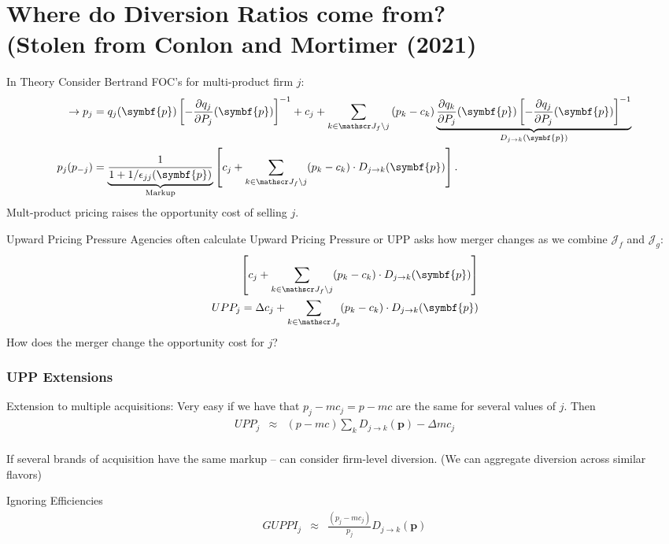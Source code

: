 \documentclass[aspectratio=169,10pt]{beamer}
\begin{document}
\section{Where do Diversion Ratios come from?\\ (Stolen from Conlon and Mortimer (2021)}
\begin{frame}{In Theory}
\footnotesize
Consider Bertrand FOC's for multi-product firm $j$:
\begin{align*}
\label{eq:best_response}
\rightarrow \nonumber p_j &=q_{j}(\symbf{p}) \left[-\frac{\partial q_{j}}{\partial P_{j}}(\symbf{p})\right]^{-1} + c_{j} + \sum_{k \in \calJ_{f} \setminus j} \left(p_{k}-c_{k}\right) \underbrace{\frac{\partial q_{k}}{\partial P_{j}}(\symbf{p})\left[-\frac{\partial q_{j}}{\partial P_{j}}(\symbf{p})\right]^{-1}}_{D_{j \rightarrow k}(\symbf{p})}\\
p_j(p_{-j}) &= \underbrace{\frac{1}{1+1/\epsilon_{jj}(\symbf{p})}}_{\text{Markup}} \left[ c_j + \sum_{k \in \calJ_{f} \setminus j}  (p_k-c_k) \cdot  D_{j \rightarrow k} (\symbf{p}) \right].
\end{align*}
Mult-product pricing \alert{raises the opportunity cost} of selling $j$.
\end{frame}

\begin{frame}{Upward Pricing Pressure}
Agencies often calculate \alert{Upward Pricing Pressure} or UPP asks how merger \alert{changes} as we combine $\mathcal{J}_f$ and $\mathcal{J}_g$:
\begin{align*}
\left[ c_j + \sum_{k \in \calJ_{f} \setminus j}  (p_k-c_k) \cdot  D_{j \rightarrow k} (\symbf{p}) \right] \\
UPP_j = \Delta c_j + \sum_{k \in \calJ_{g}}  (p_k-c_k) \cdot  D_{j \rightarrow k} (\symbf{p}) 
\end{align*}
How does the merger change the \alert{opportunity cost} for $j$?
\end{frame}

\begin{frame}
\frametitle{UPP Extensions}
\begin{block}{Extension to multiple acquisitions:}
Very easy if we have that $p_j - mc_j = p - mc$ are the same for several values of $j$.  Then
\begin{eqnarray*}
UPP_j &\approx& (p - mc) \sum_k D_{j \rightarrow k}(\symbf{p}) -  \Delta mc_j \\
\end{eqnarray*}
\end{block}
If several brands of acquisition have the same markup -- can consider firm-level diversion. (We can aggregate diversion across similar flavors)
\begin{block}{Ignoring Efficiencies}
\begin{eqnarray*}
GUPPI_j &\approx& \frac{(p_j - mc_j)}{p_j} D_{j \rightarrow k}(\symbf{p}) \\
\end{eqnarray*}
\end{block}
\end{frame}
\end{document}
